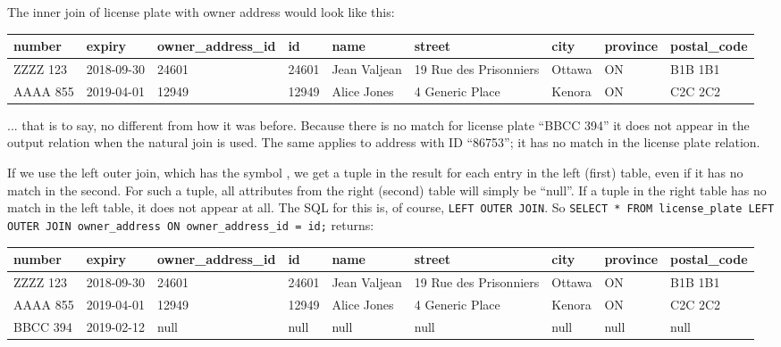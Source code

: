 The inner join of license plate with owner address would look like this: 

{\scriptsize
\begin{center}
	\begin{tabular}{|l|l|l|l|l|l|l|l|l|}\hline
		\textbf{number} & \textbf{expiry} & \textbf{owner\_address\_id} & \textbf{id} & \textbf{name} &\textbf{street} & \textbf{city} & \textbf{province} & \textbf{postal\_code} \\ \hline
		ZZZZ 123 & 2018-09-30 & 24601 & 24601 & Jean Valjean & 19 Rue des Prisonniers & Ottawa & ON & B1B 1B1\\ \hline
		AAAA 855 & 2019-04-01 & 12949 & 12949 & Alice Jones & 4 Generic Place & Kenora & ON & C2C 2C2\\ \hline
	\end{tabular}
\end{center}
}

... that is to say, no different from how it was before. Because there is no match for license plate ``BBCC 394'' it does not appear in the output relation when the natural join is used. The same applies to address with ID ``86753''; it has no match in the license plate relation. 

If we use the left outer join, which has the symbol {\tiny {}}, we get a tuple in the result for each entry in the left (first) table, even if it has no match in the second. For such a tuple, all attributes from the right (second) table will simply be ``null''. If a tuple in the right table has no match in the left table, it does not appear at all. The SQL for this is, of course, \texttt{LEFT OUTER JOIN}. So \texttt{SELECT * FROM license\_plate LEFT OUTER JOIN owner\_address ON owner\_address\_id = id;} returns:

{\scriptsize
\begin{center}
	\begin{tabular}{|l|l|l|l|l|l|l|l|l|}\hline
		\textbf{number} & \textbf{expiry} & \textbf{owner\_address\_id} & \textbf{id} & \textbf{name} &\textbf{street} & \textbf{city} & \textbf{province} & \textbf{postal\_code} \\ \hline
		ZZZZ 123 & 2018-09-30 & 24601 & 24601 & Jean Valjean & 19 Rue des Prisonniers & Ottawa & ON & B1B 1B1\\ \hline
		AAAA 855 & 2019-04-01 & 12949 & 12949 & Alice Jones & 4 Generic Place & Kenora & ON & C2C 2C2\\ \hline
		BBCC 394 & 2019-02-12 & null & null & null & null & null & null & null \\ \hline
	\end{tabular}
\end{center}
}

